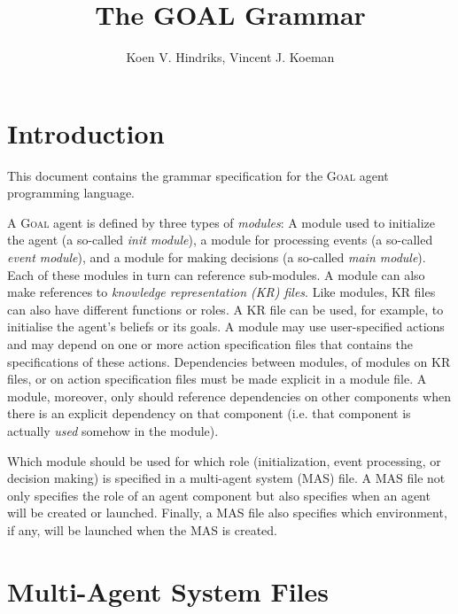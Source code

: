 \documentclass{article}
\newcommand{\GOAL}{\textsc{Goal}\xspace}
\begin{document}
\title{The GOAL Grammar}
\author{Koen V. Hindriks, Vincent J. Koeman}
\maketitle


%
%
\section{Introduction}
%

This document contains the grammar specification for the \GOAL agent programming language.

A \GOAL agent is defined by three types of \textit{modules}: A module used to initialize the agent (a so-called \textit{init module}), a module for processing events (a so-called \textit{event module}), and a module for making decisions (a so-called \textit{main module}). Each of these modules in turn can reference sub-modules. A module can also make references to \textit{knowledge representation (KR) files}. Like modules, KR files can also have different functions or roles. A KR file can be used, for example, to initialise the agent's beliefs or its goals. A module may use user-specified actions and may depend on one or more action specification files that contains the specifications of these actions. Dependencies between modules, of modules on KR files, or on action specification files must be made explicit in a module file. A module, moreover, only should reference dependencies on other components when there is an explicit dependency on that component (i.e. that component is actually \textit{used} somehow in the module).

Which module should be used for which role (initialization, event processing, or decision making) is specified in a multi-agent system (MAS) file. A MAS file not only specifies the role of an agent component but also specifies when an agent will be created or launched. Finally, a MAS file also specifies which environment, if any, will be launched when the MAS is created.


%
%
\section{Multi-Agent System Files}
%

\newcommand{\use}{\texttt{use}\xspace}
\newcommand{\as}{\texttt{as}\xspace}
\newcommand{\with}{\texttt{with}\xspace}
\newcommand{\environment}{\texttt{environment}\xspace}
\newcommand{\agent}{\texttt{agent}\xspace}
\newcommand{\define}{\texttt{define}\xspace}
\newcommand{\knowledge}{\texttt{knowledge}\xspace}
\newcommand{\beliefs}{\texttt{beliefs}\xspace}
\newcommand{\goals}{\texttt{goals}\xspace}
\newcommand{\initmod}{\texttt{init}\xspace}
\newcommand{\eventmod}{\texttt{event}\xspace}
\newcommand{\mainmod}{\texttt{main}\xspace}
\newcommand{\module}{\texttt{module}}
\newcommand{\launchpolicy}{\texttt{launchpolicy}\xspace}
\newcommand{\when}{\texttt{when}\xspace}
\newcommand{\entity}{\texttt{entity}\xspace}
\newcommand{\launch}{\texttt{launch}\xspace}
\newcommand{\name}{\texttt{name}\xspace}
\newcommand{\type}{\texttt{type}\xspace}
\newcommand{\nr}{\texttt{number}\xspace}
\newcommand{\maxnr}{\texttt{max}\xspace}
\end{document}
